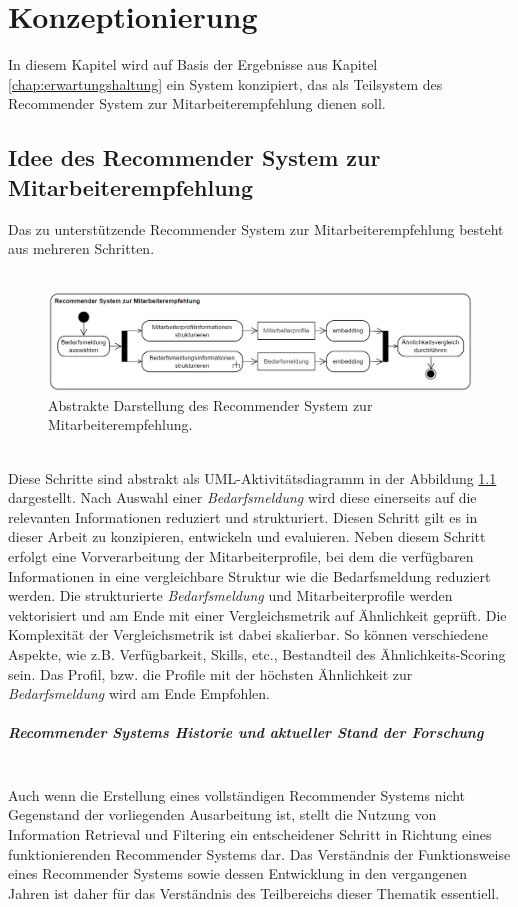 \chapter{Konzeptionierung}
\label{chap:konzeption}
In diesem Kapitel wird auf Basis der Ergebnisse aus Kapitel \ref{chap:erwartungshaltung} ein System konzipiert, das als Teilsystem des Recommender System zur Mitarbeiterempfehlung dienen soll.
\section{Idee des Recommender System zur Mitarbeiterempfehlung}
Das zu unterstützende Recommender System zur Mitarbeiterempfehlung besteht aus mehreren Schritten.\\
\\
\begin{figure}[H]
	\centering  
	\includegraphics[width=\linewidth]{Abbildungen/recommendersystem.png}
	\caption{Abstrakte Darstellung des Recommender System zur Mitarbeiterempfehlung.}
	\label{fig:recommendersystem}
\end{figure}\mbox{} \\
Diese Schritte sind abstrakt als UML-Aktivitätsdiagramm in der Abbildung \ref{fig:recommendersystem} dargestellt. Nach Auswahl einer \emph{Bedarfsmeldung} wird diese einerseits auf die relevanten Informationen reduziert und strukturiert. Diesen Schritt gilt es in dieser Arbeit zu konzipieren, entwickeln und evaluieren. Neben diesem Schritt erfolgt eine Vorverarbeitung der Mitarbeiterprofile, bei dem die verfügbaren Informationen in eine vergleichbare Struktur wie die Bedarfsmeldung reduziert werden. Die strukturierte \emph{Bedarfsmeldung} und Mitarbeiterprofile werden vektorisiert und am Ende mit einer Vergleichsmetrik auf Ähnlichkeit geprüft. Die Komplexität der Vergleichsmetrik ist dabei skalierbar. So können verschiedene Aspekte, wie z.B. Verfügbarkeit, Skills, etc., Bestandteil des Ähnlichkeits-Scoring sein. Das Profil, bzw. die Profile mit der höchsten Ähnlichkeit zur \emph{Bedarfsmeldung} wird am Ende Empfohlen.
\paragraph{Recommender Systems Historie und aktueller Stand der Forschung}\label{sec:rechistory}\mbox{} \\
Auch wenn die Erstellung eines vollständigen Recommender Systems nicht Gegenstand der vorliegenden Ausarbeitung ist, stellt die Nutzung von Information Retrieval und Filtering ein entscheidener Schritt in Richtung eines funktionierenden Recommender Systems dar. Das Verständnis der Funktionsweise eines Recommender Systems sowie dessen Entwicklung in den vergangenen Jahren ist daher für das Verständnis des Teilbereichs dieser Thematik essentiell.\\

